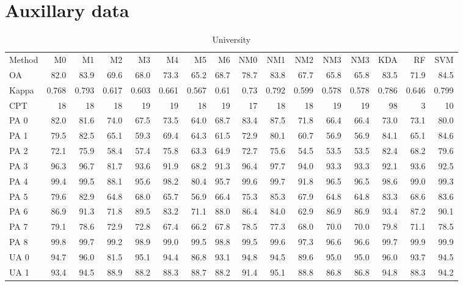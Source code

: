 \documentclass[a4paper,10pt,DIV=16]{scrartcl}
\begin{document}
\section{Auxillary data}
\label{sec:auxillary}

\begin{table}[h]
  \footnotesize
  \centering
  \caption{University}
  \begin{tabular}{lrrrrrrrrrrrrrrr}
    Method & M0 & M1 & M2 & M3 & M4 & M5 & M6 & NM0 & NM1 & NM2 & NM3 & NM3 & KDA & RF & SVM \\
    OA & 82.0 & 83.9 & 69.6 & 68.0 & 73.3 & 65.2 & 68.7 & 78.7 & 83.8 & 67.7 & 65.8 & 65.8 & 83.5 & 71.9 & 84.5 \\
    Kappa & 0.768 & 0.793 & 0.617 & 0.603 & 0.661 & 0.567 & 0.61 & 0.73 & 0.792 & 0.599 & 0.578 & 0.578 & 0.786 & 0.646 & 0.799 \\
    CPT & 18 & 18 & 18 & 19 & 19 & 18 & 19 & 17 & 18 & 18 & 19 & 19 & 98 & 3 & 10 \\
    PA 0 & 82.0 & 81.6 & 74.0 & 67.5 & 73.5 & 64.0 & 68.7 & 83.4 & 87.5 & 71.8 & 66.4 & 66.4 & 73.0 & 73.1 & 80.0 \\
    PA 1 & 79.5 & 82.5 & 65.1 & 59.3 & 69.4 & 64.3 & 61.5 & 72.9 & 80.1 & 60.7 & 56.9 & 56.9 & 84.1 & 65.1 & 84.6 \\
    PA 2 & 72.1 & 75.9 & 58.4 & 57.4 & 75.8 & 63.3 & 64.9 & 72.7 & 75.6 & 54.5 & 53.5 & 53.5 & 82.4 & 68.2 & 79.6 \\
    PA 3 & 96.3 & 96.7 & 81.7 & 93.6 & 91.9 & 68.2 & 91.3 & 96.4 & 97.7 & 94.0 & 93.3 & 93.3 & 92.1 & 93.6 & 92.5 \\
    PA 4 & 99.4 & 99.5 & 88.1 & 95.6 & 98.2 & 80.4 & 95.7 & 99.6 & 99.7 & 91.8 & 96.5 & 96.5 & 98.6 & 99.0 & 99.3 \\
    PA 5 & 79.6 & 82.9 & 64.8 & 68.0 & 65.7 & 56.9 & 66.4 & 75.3 & 85.3 & 67.9 & 64.8 & 64.8 & 83.3 & 68.6 & 83.6 \\
    PA 6 & 86.9 & 91.3 & 71.8 & 89.5 & 83.2 & 71.1 & 88.0 & 86.4 & 84.0 & 62.9 & 86.9 & 86.9 & 93.4 & 87.2 & 90.1 \\
    PA 7 & 79.1 & 78.6 & 72.9 & 72.8 & 67.4 & 66.2 & 67.8 & 78.5 & 77.3 & 68.0 & 70.0 & 70.0 & 79.8 & 71.1 & 78.5 \\
    PA 8 & 99.8 & 99.7 & 99.2 & 98.9 & 99.0 & 99.5 & 98.8 & 99.5 & 99.6 & 97.3 & 96.6 & 96.6 & 99.7 & 99.9 & 99.9 \\
    UA 0 & 94.7 & 96.0 & 81.5 & 95.1 & 94.4 & 86.8 & 93.1 & 94.8 & 94.5 & 89.6 & 95.0 & 95.0 & 96.0 & 93.7 & 94.5 \\
    UA 1 & 93.4 & 94.5 & 88.9 & 88.2 & 88.3 & 88.7 & 88.2 & 91.4 & 95.1 & 88.8 & 86.8 & 86.8 & 94.8 & 88.3 & 94.2 \\

\end{tabular}
\end{table}
\end{document}
